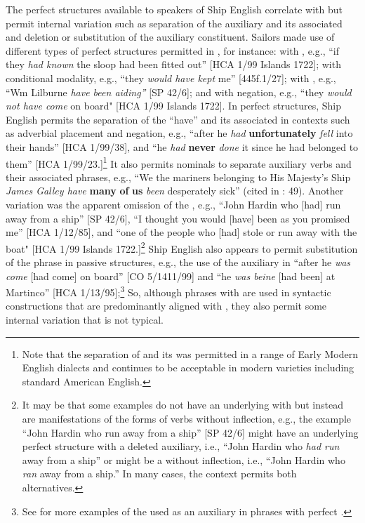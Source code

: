 The perfect structures available to speakers of Ship English correlate with  but permit internal variation such as separation of the auxiliary and its associated  and deletion or substitution of the auxiliary constituent. Sailors made use of different types of perfect structures permitted in , for instance:  with , e.g., “if they \textit{had known} the sloop had been fitted out” [HCA 1/99  Islands 1722];  with conditional modality, e.g., “they \textit{would have kept} me” [445f.1/27];  with , e.g., “Wm Lilburne \textit{have been aiding”} [SP 42/6]; and  with negation, e.g., “they \textit{would not have come} on board" [HCA 1/99  Islands 1722]. In perfect structures, Ship English permits the separation of the  “have” and its associated   in contexts such as adverbial placement and negation, e.g., “after he \textit{had} \textbf{unfortunately} \textit{fell} into their hands” [HCA 1/99/38], and “he \textit{had} \textbf{never} \textit{done} it since he had belonged to them” [HCA 1/99/23.]\footnote{Note that the separation of  and its   was permitted in a range of Early Modern English dialects and continues to be acceptable in modern varieties including standard American English.} It also permits nominals to separate auxiliary verbs and their associated   phrases, e.g., “We the mariners belonging to His Majesty’s Ship \textit{James Galley have} \textbf{many} \textbf{of} \textbf{us} \textit{been} desperately sick” (cited in \citealt{Brown2011}: 49). Another variation was the apparent omission of the , e.g., “John Hardin who [had] run away from a ship” [SP 42/6], “I thought you would [have] been as you promised me” [HCA 1/12/85], and “one of the people who [had] stole or run away with the boat" [HCA 1/99  Islands 1722.]\footnote{It may be that some examples do not have an underlying  with  but instead are manifestations of the  forms of verbs without  inflection, e.g., the example “John Hardin who run away from a ship” [SP 42/6] might have an underlying perfect structure with a deleted auxiliary, i.e., “John Hardin who \textit{had run} away from a ship” or might be a   without inflection, i.e., “John Hardin who \textit{ran} away from a ship.” In many cases, the context permits both alternatives.}  Ship English also appears to permit substitution of the  phrase in passive structures, e.g., the use of the  auxiliary in “after he \textit{was come} [had come] on board” [CO 5/1411/99] and “he \textit{was beine} [had been] at Martinco” [HCA 1/13/95];\footnote{See  for more examples of the  used as an auxiliary in  phrases with perfect .}  So, although  phrases with  are used in syntactic constructions that are predominantly aligned with , they also permit some internal variation that is not typical. 

